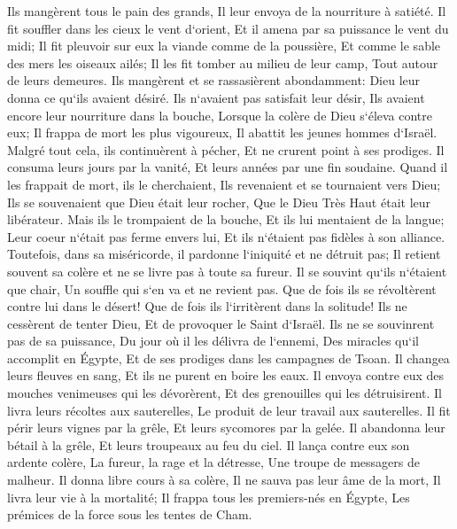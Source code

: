 \verse Ils mangèrent tous le pain des grands, Il leur envoya de la nourriture à satiété. 
\verse Il fit souffler dans les cieux le vent d`orient, Et il amena par sa puissance le vent du midi; 
\verse Il fit pleuvoir sur eux la viande comme de la poussière, Et comme le sable des mers les oiseaux ailés; 
\verse Il les fit tomber au milieu de leur camp, Tout autour de leurs demeures. 
\verse Ils mangèrent et se rassasièrent abondamment: Dieu leur donna ce qu`ils avaient désiré. 
\verse Ils n`avaient pas satisfait leur désir, Ils avaient encore leur nourriture dans la bouche, 
\verse Lorsque la colère de Dieu s`éleva contre eux; Il frappa de mort les plus vigoureux, Il abattit les jeunes hommes d`Israël. 
\verse Malgré tout cela, ils continuèrent à pécher, Et ne crurent point à ses prodiges. 
\verse Il consuma leurs jours par la vanité, Et leurs années par une fin soudaine. 
\verse Quand il les frappait de mort, ils le cherchaient, Ils revenaient et se tournaient vers Dieu; 
\verse Ils se souvenaient que Dieu était leur rocher, Que le Dieu Très Haut était leur libérateur. 
\verse Mais ils le trompaient de la bouche, Et ils lui mentaient de la langue; 
\verse Leur coeur n`était pas ferme envers lui, Et ils n`étaient pas fidèles à son alliance. 
\verse Toutefois, dans sa miséricorde, il pardonne l`iniquité et ne détruit pas; Il retient souvent sa colère et ne se livre pas à toute sa fureur. 
\verse Il se souvint qu`ils n`étaient que chair, Un souffle qui s`en va et ne revient pas. 
\verse Que de fois ils se révoltèrent contre lui dans le désert! Que de fois ils l`irritèrent dans la solitude! 
\verse Ils ne cessèrent de tenter Dieu, Et de provoquer le Saint d`Israël. 
\verse Ils ne se souvinrent pas de sa puissance, Du jour où il les délivra de l`ennemi, 
\verse Des miracles qu`il accomplit en Égypte, Et de ses prodiges dans les campagnes de Tsoan. 
\verse Il changea leurs fleuves en sang, Et ils ne purent en boire les eaux. 
\verse Il envoya contre eux des mouches venimeuses qui les dévorèrent, Et des grenouilles qui les détruisirent. 
\verse Il livra leurs récoltes aux sauterelles, Le produit de leur travail aux sauterelles. 
\verse Il fit périr leurs vignes par la grêle, Et leurs sycomores par la gelée. 
\verse Il abandonna leur bétail à la grêle, Et leurs troupeaux au feu du ciel. 
\verse Il lança contre eux son ardente colère, La fureur, la rage et la détresse, Une troupe de messagers de malheur. 
\verse Il donna libre cours à sa colère, Il ne sauva pas leur âme de la mort, Il livra leur vie à la mortalité; 
\verse Il frappa tous les premiers-nés en Égypte, Les prémices de la force sous les tentes de Cham. 
